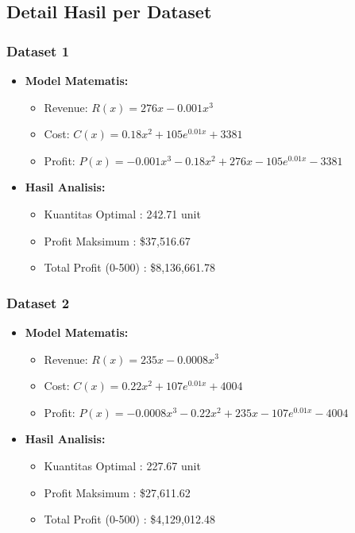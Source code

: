\documentclass[conference]{IEEEtran}
\begin{document}
\subsection{Detail Hasil per Dataset}

\subsubsection{Dataset 1}
\begin{itemize}
    \item \textbf{Model Matematis:}
    \begin{itemize}
        \item Revenue: \( R(x) = 276x - 0.001x^3 \)
        \item Cost: \( C(x) = 0.18x^2 + 105e^{0.01x} + 3381 \)
        \item Profit: \( P(x) = -0.001x^3 - 0.18x^2 + 276x - 105e^{0.01x} - 3381 \)
    \end{itemize}
    \item \textbf{Hasil Analisis:}
    \begin{itemize}
        \item Kuantitas Optimal : 242.71 unit
        \item Profit Maksimum  : \$37,516.67
        \item Total Profit (0-500) : \$8,136,661.78
    \end{itemize}
\end{itemize}

\subsubsection{Dataset 2}
\begin{itemize}
    \item \textbf{Model Matematis:}
    \begin{itemize}
        \item Revenue: \( R(x) = 235x - 0.0008x^3 \)
        \item Cost: \( C(x) = 0.22x^2 + 107e^{0.01x} + 4004 \)
        \item Profit: \( P(x) = -0.0008x^3 - 0.22x^2 + 235x - 107e^{0.01x} - 4004 \)
    \end{itemize}
    \item \textbf{Hasil Analisis:}
    \begin{itemize}
        \item Kuantitas Optimal : 227.67 unit
        \item Profit Maksimum  : \$27,611.62
        \item Total Profit (0-500) : \$4,129,012.48
    \end{itemize}
\end{itemize}
\end{document}
